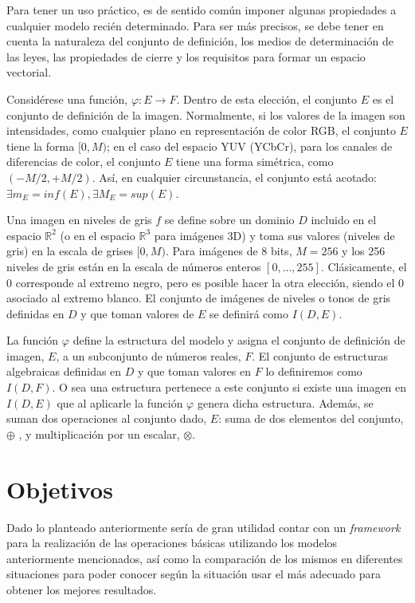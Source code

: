 Para tener un uso práctico, es de sentido común imponer algunas propiedades a cualquier modelo recién determinado. Para ser más precisos, se debe tener en cuenta la naturaleza del conjunto de definición, los medios de determinación de las leyes, las propiedades de cierre y los requisitos para formar un espacio vectorial. 

Consid\'erese una función, $\varphi : E \rightarrow F$. Dentro de esta elección, el conjunto $E$ es el conjunto de definición de la imagen. Normalmente, si los valores de la imagen son intensidades, como cualquier plano en representación de color RGB, el conjunto $E$ tiene la forma $[0,M)$; en el caso del espacio YUV (YCbCr), para los canales de diferencias de color, el conjunto $E$ tiene una forma simétrica, como $( - M/2 , + M/2 )$. Así, en cualquier circunstancia, el conjunto está acotado: $\exists m_E=inf(E),\exists M_E=sup(E)$.

Una imagen en niveles de gris $f$ se define sobre un dominio $D$ incluido en el espacio $\mathbb{R}^2$ (o en el espacio $\mathbb{R}^3$  para imágenes 3D) y toma sus valores (niveles de gris) en la escala de grises $[0, M)$. Para imágenes de 8 bits, $ M = 256$ y los 256 niveles de gris están en la escala de números enteros $[0,..., 255]$. Clásicamente, el 0 corresponde al extremo negro, pero es posible hacer la otra elección, siendo el 0 asociado al extremo blanco. El conjunto de imágenes de niveles o tonos de gris definidas en $D$ y que toman valores de $E$ se definir\'a como $I(D,E)$.

La función $\varphi$ define la estructura del modelo y asigna el conjunto de definición de imagen, $E$, a un subconjunto de números reales, $F$. El conjunto de estructuras algebraicas definidas en $D$ y que toman valores en $F$ lo definiremos como $I(D,F)$. O sea una estructura pertenece a este conjunto si existe una imagen en $I(D,E)$ que al aplicarle la funci\'on $\varphi$ genera dicha estructura. Además, se suman dos operaciones al conjunto dado, $E$: suma de dos elementos del conjunto, $\oplus$ , y multiplicación por un escalar, $\otimes$.  

\section*{Objetivos}

Dado lo planteado anteriormente ser\'ia de gran utilidad contar con un \textit{framework} para la realizaci\'on de las operaciones b\'asicas utilizando los modelos anteriormente mencionados, as\'i como la comparaci\'on de los mismos en diferentes situaciones para poder conocer seg\'un la situaci\'on usar el m\'as adecuado para obtener los mejores resultados.

